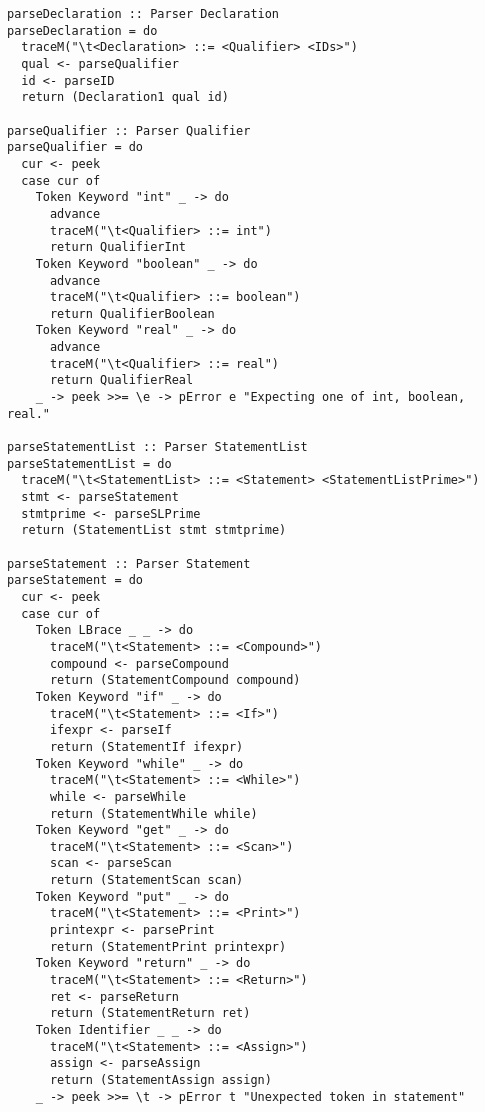 \documentclass[11pt]{article}
\begin{document}
\begin{verbatim}
parseDeclaration :: Parser Declaration
parseDeclaration = do
  traceM("\t<Declaration> ::= <Qualifier> <IDs>")
  qual <- parseQualifier
  id <- parseID
  return (Declaration1 qual id)

parseQualifier :: Parser Qualifier
parseQualifier = do
  cur <- peek
  case cur of
    Token Keyword "int" _ -> do
      advance
      traceM("\t<Qualifier> ::= int")
      return QualifierInt
    Token Keyword "boolean" _ -> do
      advance
      traceM("\t<Qualifier> ::= boolean")
      return QualifierBoolean
    Token Keyword "real" _ -> do
      advance
      traceM("\t<Qualifier> ::= real")
      return QualifierReal
    _ -> peek >>= \e -> pError e "Expecting one of int, boolean, real."

parseStatementList :: Parser StatementList
parseStatementList = do
  traceM("\t<StatementList> ::= <Statement> <StatementListPrime>")
  stmt <- parseStatement
  stmtprime <- parseSLPrime
  return (StatementList stmt stmtprime)

parseStatement :: Parser Statement
parseStatement = do
  cur <- peek
  case cur of
    Token LBrace _ _ -> do
      traceM("\t<Statement> ::= <Compound>")
      compound <- parseCompound
      return (StatementCompound compound)
    Token Keyword "if" _ -> do
      traceM("\t<Statement> ::= <If>")
      ifexpr <- parseIf
      return (StatementIf ifexpr)
    Token Keyword "while" _ -> do
      traceM("\t<Statement> ::= <While>")
      while <- parseWhile
      return (StatementWhile while)
    Token Keyword "get" _ -> do
      traceM("\t<Statement> ::= <Scan>")
      scan <- parseScan
      return (StatementScan scan)
    Token Keyword "put" _ -> do
      traceM("\t<Statement> ::= <Print>")
      printexpr <- parsePrint
      return (StatementPrint printexpr)
    Token Keyword "return" _ -> do
      traceM("\t<Statement> ::= <Return>")
      ret <- parseReturn
      return (StatementReturn ret)
    Token Identifier _ _ -> do
      traceM("\t<Statement> ::= <Assign>")
      assign <- parseAssign
      return (StatementAssign assign)
    _ -> peek >>= \t -> pError t "Unexpected token in statement"


\end{verbatim}
\end{document}
